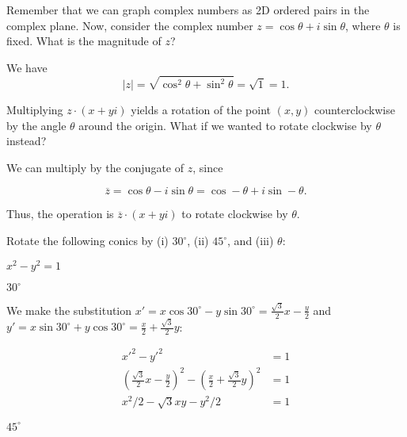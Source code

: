 \documentclass[../gatm_answers.tex]{subfiles}
\begin{document}
\begin{inner_problem}[start=1]
\item Remember that we can graph complex numbers as 2D ordered pairs in the complex plane. Now, consider the complex number $z=\cos \theta + i\sin\theta$, where $\theta$ is fixed. What is the magnitude of $z$?
\end{inner_problem}

We have $$|z|=\sqrt{\cos^2\theta + \sin^2\theta}=\sqrt{1}=1.$$

\begin{inner_problem}
\item Multiplying $z\cdot(x+yi)$ yields a rotation of the point $(x,y)$ counterclockwise by the angle $\theta$ around the origin. What if we wanted to rotate clockwise by $\theta$ instead?
\end{inner_problem}

We can multiply by the conjugate of $z$, since

$$\overline{z}=\cos\theta - i\sin\theta = \cos-\theta + i\sin-\theta.$$

Thus, the operation is $\overline{z}\cdot (x+yi)$ to rotate clockwise by $\theta$.

\begin{outer_problem}
\item Rotate the following conics by (i) $30^\circ$, (ii) $45^\circ$, and (iii) $\theta$:
\end{outer_problem}

\begin{inner_problem}[start=1]
\item $x^2-y^2=1$
\end{inner_problem}

\begin{iinner_problem}[start=1]
\item $30^\circ$
\end{iinner_problem}

We make the substitution $x'=x \cos 30^\circ - y\sin 30^\circ=\frac{\sqrt{3}}{2}x-\frac{y}{2}$ and $y'=x\sin 30^\circ + y\cos 30^\circ=\frac{x}{2}+\frac{\sqrt{3}}{2}y$:

\begin{align*}
x'^2-y'^2&=1 \\
\left(\frac{\sqrt{3}}{2}x-\frac{y}{2}\right)^2 - \left(\frac{x}{2}+\frac{\sqrt{3}}{2}y\right)^2 &= 1 \\
x^2/2 - \sqrt{3} x y - y^2/2 &= 1
\end{align*}

\begin{iinner_problem}
\item $45^\circ$
\end{iinner_problem}
\end{document}

